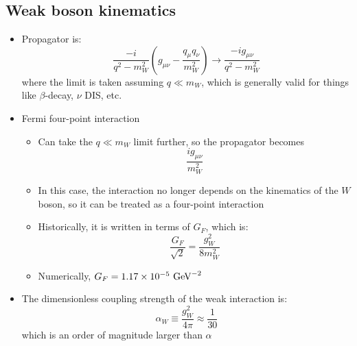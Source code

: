 \subsection{Weak boson kinematics}
\begin{itemize}
  \item Propagator is:
  \begin{equation}
    \frac{-i}{q^2 - m_W^2} \left(g_{\mu\nu} - \frac{q_\mu q_\nu}{m_W^2}\right) \rightarrow \frac{-ig_{\mu\nu}}{q^2-m_W^2}
  \end{equation}
  where the limit is taken assuming $q \ll m_W$, which is generally valid for things like $\beta$-decay, $\nu$ DIS, etc.
  \item Fermi four-point interaction
  \begin{itemize}
      \item Can take the $q\ll m_W$ limit further, so the propagator becomes
      \begin{equation}
        \frac{i g_{\mu\nu}}{m_W^2} 
      \end{equation}
      \item In this case, the interaction no longer depends on the kinematics of the $W$ boson, so it can be treated as a four-point interaction
      \item Historically, it is written in terms of $G_F$, which is:
      \begin{equation}
        \frac{G_F}{\sqrt2} = \frac{g_W^2}{8 m_W^2}
      \end{equation}
      \item Numerically, $G_F = 1.17 \times 10^{-5}~\text{GeV}^{-2}$
  \end{itemize}
  \item The dimensionless coupling strength of the weak interaction is:
  \begin{equation}
    \alpha_W \equiv \frac{g_W^2}{4\pi} \approx \frac{1}{30}
  \end{equation}
  which is an order of magnitude larger than $\alpha$
\end{itemize}

